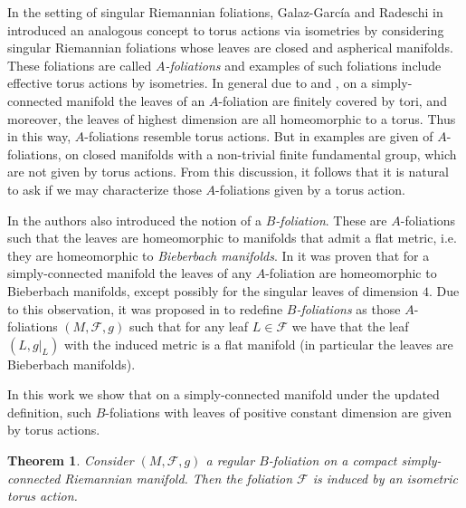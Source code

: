 \documentclass[12pt,a4paper,reqno]{amsart}
\newtheorem{mtheorem}{Theorem}
\theoremstyle{definition}
\numberwithin{equation}{section}
\newcommand{\fol}{\mathcal{F}}
\begin{document}
In the setting of singular Riemannian foliations, Galaz-García and Radeschi in \cite{GalazGarciaRadeschi2015} introduced an analogous concept to torus actions via isometries by considering singular Riemannian foliations whose leaves are closed and aspherical manifolds. These foliations are called \emph{$A$-foliations} and examples of such foliations include effective torus actions by isometries. In general due to \cite{GalazGarciaRadeschi2015} and \cite{Corro2023}, on a simply-connected manifold the leaves of an $A$-foliation are finitely covered by tori, and  moreover, the leaves of highest dimension are all homeomorphic to a torus.  Thus in this way, $A$-foliations resemble torus actions.  But in \cite{FarrellWu2019} examples are given of $A$-foliations, on closed manifolds with a non-trivial finite fundamental group, which are not given by torus actions. From this discussion,  it follows that it is natural to ask if we may characterize those $A$-foliations given by a torus action. 

In \cite{GalazGarciaRadeschi2015} the authors also introduced the notion of a \emph{$B$-foliation}. These are $A$-foliations such that the leaves are homeomorphic to manifolds that admit a flat metric, i.e. they are homeomorphic to \emph{Bieberbach manifolds}. In \cite[Theorem C]{Corro2023} it was proven that for  a simply-connected manifold the leaves of any $A$-foliation are homeomorphic to Bieberbach manifolds, except possibly for the singular leaves of dimension $4$. Due to this observation,  it was proposed in \cite{Corro2023} to redefine \emph{$B$-foliations} as those $A$-foliations $(M,\fol,g)$ such that for any leaf $L\in \fol$ we have that  the leaf $(L,g|_{L})$ with the induced metric is a flat manifold (in particular the leaves are Bieberbach manifolds). 

In this work we show that  on a simply-connected manifold under the updated definition, such $B$-foliations with leaves of positive constant dimension are given by torus actions.

\begin{mtheorem}\th\label{MT: flat foliations are given by group actions}
Consider $(M,\fol,g)$ a regular $B$-foliation on a compact simply-connected Riemannian manifold. Then the foliation $\fol$ is induced by an isometric torus action.
\end{mtheorem}
\end{document}

